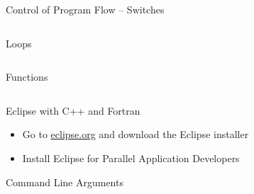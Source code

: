 \documentclass[10pt]{beamer}
\begin{document}
\begin{frame}{Control of Program Flow -- Switches}
\begin{columns}[c]
  \begin{column}{0.5\textwidth}
    
  \end{column}
  \begin{column}{0.5\textwidth}
    
  \end{column}
\end{columns}
\end{frame}

\begin{frame}{Loops}
\begin{columns}[c]
  \begin{column}{0.5\textwidth}
    
  \end{column}
  \begin{column}{0.5\textwidth}
    
  \end{column}
\end{columns}
\end{frame}

\begin{frame}{Functions}
\begin{columns}[c]
  \begin{column}{0.5\textwidth}
    
  \end{column}
  \begin{column}{0.5\textwidth}
    
  \end{column}
\end{columns}
\end{frame}

\begin{frame}{Eclipse with C++ and Fortran}

\begin{itemize}
 \item Go to \url{eclipse.org} and download the Eclipse installer
 \item Install Eclipse for Parallel Application Developers
\end{itemize}

\end{frame}


\begin{frame}{Command Line Arguments}
\begin{columns}[c]
  \begin{column}{0.5\textwidth}
    
  \end{column}
  \begin{column}{0.5\textwidth}
    
  \end{column}
\end{columns}
\end{frame}
\end{document}
